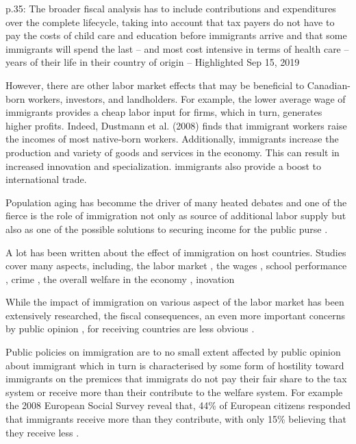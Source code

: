 p.35: The broader fiscal analysis has to include contributions and expenditures over the complete lifecycle, taking into account that tax payers do not have to pay the costs of child care and education before immigrants arrive and that some immigrants will spend the last – and most cost intensive in terms of health care – years of their life in their country of origin -- Highlighted Sep 15, 2019

However, there are other labor  market effects that may be beneficial to Canadian-born workers, investors, and landholders. For example, the lower average wage of immigrants provides a cheap labor  input for firms, which in turn, generates higher profits. Indeed, Dustmann et al. (2008) finds that immigrant workers raise the incomes of most native-born workers. Additionally, immigrants increase the production and variety of goods and services in the economy. This can result in increased innovation and specialization. immigrants also provide a boost to international trade. \citep{Javdani:2013gu}


Population aging has becomme the driver of many heated debates and one of the fierce is the role of immigration not only as source of additional labor  supply but also as one of the possible solutions to securing income for the public purse \citep{Hansen:2017uz}.


  A lot has been written about the effect of immigration on host countries. Studies cover many aspects, including, the labor  market \citep{Borjas:2003cr,Dustmann:2016by}, the wages \citep{Dustmann:2013hk,Eberhard:2012te},  school performance \citep{Brunello:2013cy}, crime \citep{Chalfin:2015fb}, the overall welfare in the economy \citep{Ileri:2019hf,Akin:gh,dunganMacroeconomicImpactsCanadian2013,Fougere:2011ht}, inovation \citep{Hunt:2008fn,Partridge:2008up}



  While the impact of immigration on various aspect of the labor  market has been extensively researched, the fiscal consequences, an even more important concerns by public opinion \citep{Dustmann:2014dr}, for receiving countries are less obvious \citep{Preston:2014uw}.

  Public policies on immigration are to no small extent affected by public opinion about immigrant which in turn is characterised by some form of hostility toward immigrants on the premices that immigrats do not pay their fair share to the tax system or receive more than their contribute to the welfare system\citep{Dustmann:2007fl}. For example the 2008 European Social Survey reveal that, 44\% of European citizens responded that immigrants receive more than they contribute, with only 15\% believing that they receive less \citep{Dustmann:2014dr}.

